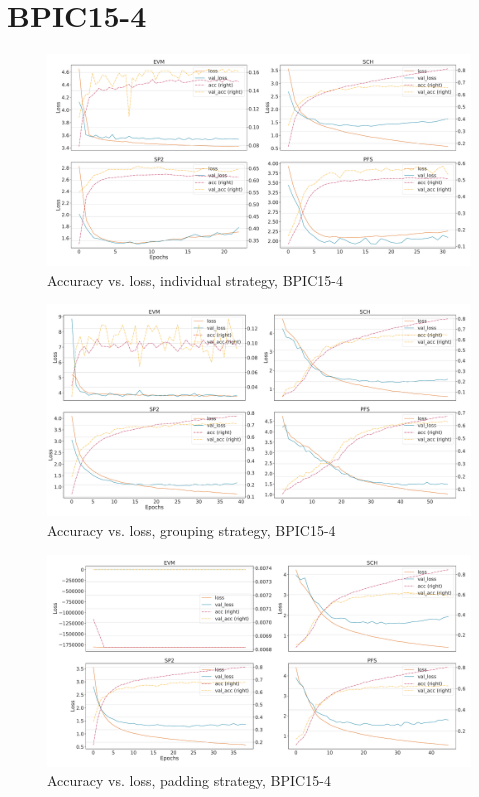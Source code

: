 \section*{BPIC15-4}
\begin{figure}[!htb]
    \centering
    \includegraphics[width=\textwidth]{gfx/bpic2015_4/individual_loss_acc_curve.pdf}
    \caption{Accuracy vs. loss, individual strategy, BPIC15-4}
\end{figure}
\begin{figure}[!htb]
    \centering
    \includegraphics[width=\textwidth]{gfx/bpic2015_4/grouped_loss_acc_curve.pdf}
    \caption{Accuracy vs. loss, grouping strategy, BPIC15-4}
\end{figure}
\begin{figure}[!htb]
    \centering
    \includegraphics[width=\textwidth]{gfx/bpic2015_4/padded_loss_acc_curve.pdf}
    \caption{Accuracy vs. loss, padding strategy, BPIC15-4}
\end{figure}
